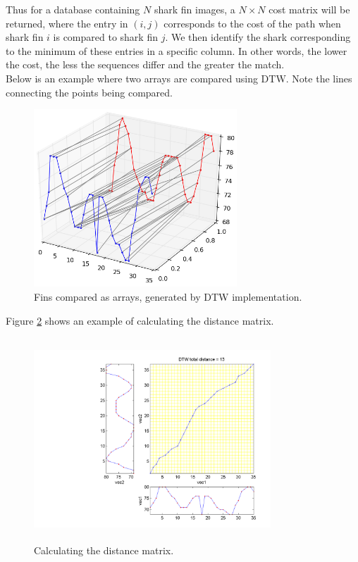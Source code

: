 \documentclass[a4paper,10pt]{article}
\begin{document}
Thus for a database containing $N$ shark fin images, a $N \times N$ cost
matrix will be returned, where the entry in $(i, j)$ corresponds to the cost
of the path when shark fin $i$ is compared to shark fin $j$.  We then identify the shark
corresponding to the minimum of these entries in a specific
column.
In other words, the lower the cost, the less the sequences differ and the greater the match.  \\

Below is an example where two arrays are compared using DTW. Note the lines
connecting the points being compared.  

\begin{figure}[H]
 \centering
 \includegraphics[width=3in]{dtw.jpg}
 \caption{Fins compared as arrays, generated by DTW implementation.}
 \label{dtw}
\end{figure}

Figure \ref{dtw1} shows an example of calculating the distance matrix.

\begin{figure}[H]
 \centering
 \includegraphics[width=3.5in, height=3in]{dtw1.png}
 \caption{Calculating the distance matrix\cite{dtw}.}
 \label{dtw1}
\end{figure}
\end{document}
